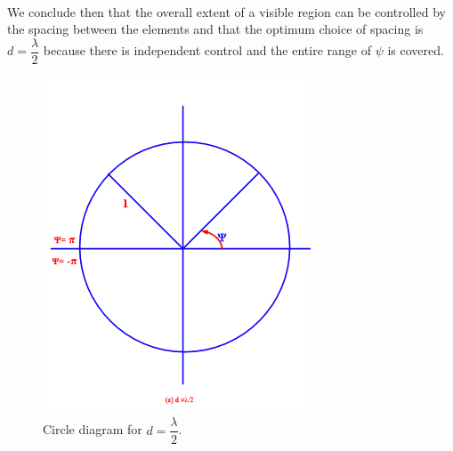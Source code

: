 \paragraph{}
We conclude then that the overall extent of a visible region can be controlled by the spacing between the elements and that the optimum choice of spacing is $d=\dfrac{\lambda}{2}$ because there is independent control and the entire range of $\psi$ is covered.
\begin{figure}[h]
\centering
\begin{minipage}[b]{0.4\textwidth}
\includegraphics[width=1\linewidth]{"./graphics/fig 55_4a"}
\caption{Circle diagram for $d=\dfrac{\lambda}{2}$.}
\label{fig:fig-55_4a}
\end{minipage}
\hfill
\begin{minipage}[b]{0.4\textwidth}

\end{minipage}
\end{figure}
